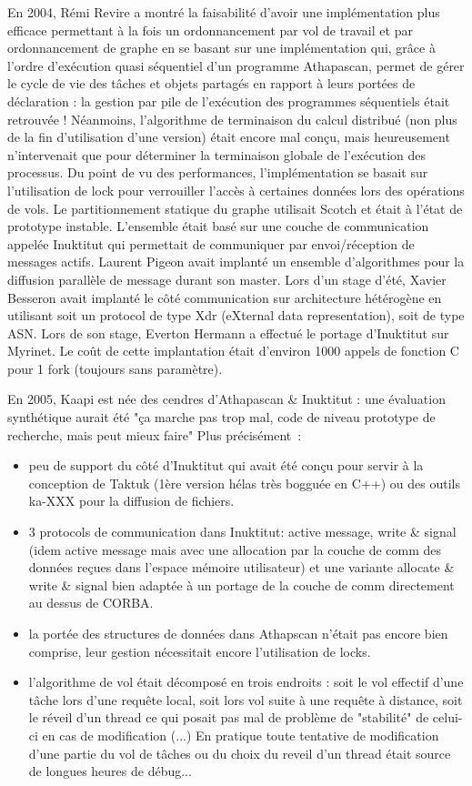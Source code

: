 \documentclass{report}
\begin{document}
En 2004, Rémi Revire a montré la faisabilité d'avoir une implémentation plus efficace permettant à la fois un ordonnancement par vol de travail et par ordonnancement de graphe en se basant sur une implémentation qui, grâce à l'ordre d'exécution quasi séquentiel d'un programme Athapascan, permet de gérer le cycle de vie des tâches et objets partagés en rapport à leurs portées de déclaration : la gestion par pile de l'exécution des programmes séquentiels était retrouvée ! Néanmoins, l'algorithme de terminaison du calcul distribué (non plus de la fin d'utilisation d'une version) était encore mal conçu, mais heureusement n'intervenait que pour déterminer la terminaison globale de l'exécution des processus.
Du point de vu des performances, l'implémentation se basait sur l'utilisation de lock pour verrouiller l'accès à certaines données lors des opérations de vols. Le partitionnement statique du graphe utilisait Scotch et était à l'état de prototype instable. L'ensemble était basé sur une couche de communication appelée Inuktitut qui permettait de communiquer par envoi/réception de messages actifs. 
Laurent Pigeon avait implanté un ensemble d'algorithmes pour la diffusion parallèle de message durant son master.
Lors d'un stage d'été, Xavier Besseron avait implanté le côté communication sur architecture hétérogène en utilisant soit un protocol de type Xdr (eXternal data representation), soit de type ASN.
Lors de son stage, Everton Hermann a effectué le portage d'Inuktitut sur Myrinet.
Le coût de cette implantation était d'environ 1000 appels de fonction C pour 1 fork (toujours sans paramètre).

En 2005, Kaapi est née des cendres d'Athapascan \& Inuktitut : une évaluation synthétique aurait été "ça marche pas trop mal, code de niveau prototype de recherche, mais peut mieux faire"
Plus précisément~:
\begin{itemize}
\item peu de support du côté d'Inuktitut qui avait été conçu pour servir à la conception de Taktuk (1ère version hélas très bogguée en C++) ou des outils ka-XXX pour la diffusion de fichiers.
\item 3 protocols de communication dans Inuktitut: active message, write \& signal (idem active message mais avec une allocation par la couche de comm des données reçues dans l'espace mémoire utilisateur) et une variante allocate \& write \& signal bien adaptée à un portage de la couche de comm directement au dessus de CORBA.
\item la portée des structures de données dans Athapscan n'était pas encore bien comprise, leur gestion nécessitait encore l'utilisation de locks.
\item l'algorithme de vol était décomposé en trois endroits : soit le vol effectif d'une tâche lors d'une requête local, soit lors vol suite à une requête à distance, soit le réveil d'un thread ce qui posait pas mal de problème de "stabilité" de celui-ci en cas de modification (...) En pratique toute tentative de modification d'une partie du vol de tâches ou du choix du reveil d'un thread était source de longues heures de débug...
\end{itemize}
\end{document}
